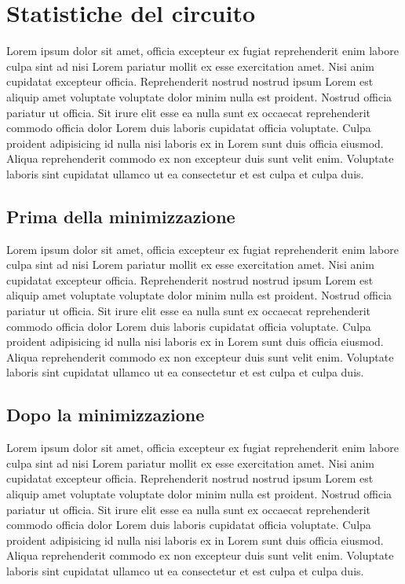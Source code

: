 \documentclass[a4paper]{article}
\begin{document}
\section{Statistiche del circuito}
Lorem ipsum dolor sit amet, officia excepteur ex fugiat reprehenderit enim labore culpa sint ad nisi Lorem pariatur mollit ex esse exercitation amet. Nisi anim cupidatat excepteur officia. Reprehenderit nostrud nostrud ipsum Lorem est aliquip amet voluptate voluptate dolor minim nulla est proident. Nostrud officia pariatur ut officia. Sit irure elit esse ea nulla sunt ex occaecat reprehenderit commodo officia dolor Lorem duis laboris cupidatat officia voluptate. Culpa proident adipisicing id nulla nisi laboris ex in Lorem sunt duis officia eiusmod. Aliqua reprehenderit commodo ex non excepteur duis sunt velit enim. Voluptate laboris sint cupidatat ullamco ut ea consectetur et est culpa et culpa duis.

\subsection{Prima della minimizzazione}
Lorem ipsum dolor sit amet, officia excepteur ex fugiat reprehenderit enim labore culpa sint ad nisi Lorem pariatur mollit ex esse exercitation amet. Nisi anim cupidatat excepteur officia. Reprehenderit nostrud nostrud ipsum Lorem est aliquip amet voluptate voluptate dolor minim nulla est proident. Nostrud officia pariatur ut officia. Sit irure elit esse ea nulla sunt ex occaecat reprehenderit commodo officia dolor Lorem duis laboris cupidatat officia voluptate. Culpa proident adipisicing id nulla nisi laboris ex in Lorem sunt duis officia eiusmod. Aliqua reprehenderit commodo ex non excepteur duis sunt velit enim. Voluptate laboris sint cupidatat ullamco ut ea consectetur et est culpa et culpa duis.


\subsection{Dopo la minimizzazione}
Lorem ipsum dolor sit amet, officia excepteur ex fugiat reprehenderit enim labore culpa sint ad nisi Lorem pariatur mollit ex esse exercitation amet. Nisi anim cupidatat excepteur officia. Reprehenderit nostrud nostrud ipsum Lorem est aliquip amet voluptate voluptate dolor minim nulla est proident. Nostrud officia pariatur ut officia. Sit irure elit esse ea nulla sunt ex occaecat reprehenderit commodo officia dolor Lorem duis laboris cupidatat officia voluptate. Culpa proident adipisicing id nulla nisi laboris ex in Lorem sunt duis officia eiusmod. Aliqua reprehenderit commodo ex non excepteur duis sunt velit enim. Voluptate laboris sint cupidatat ullamco ut ea consectetur et est culpa et culpa duis.
\end{document}
